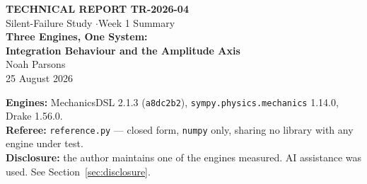\documentclass[11pt,a4paper]{article}
\newcommand{\gitsha}[1]{\texttt{#1}}
\begin{document}
\begin{titlepage}
\centering
\vspace*{2.2cm}
{\footnotesize\bfseries TECHNICAL REPORT TR-2026-04}\\[0.4em]
{\footnotesize Silent-Failure Study \quad$\cdot$\quad Week 1 Summary}\\[2.0cm]
{\LARGE\bfseries Three Engines, One System:\\[0.35em]
 Integration Behaviour and the Amplitude Axis}\\[1.5cm]
{\large Noah Parsons}\\[0.5cm]
{\normalsize 25 August 2026}\\[2.0cm]
\begin{minipage}{0.82\textwidth}
\small
\textbf{Engines:} MechanicsDSL 2.1.3 (\gitsha{a8dc2b2}),
\texttt{sympy.physics.mechanics} 1.14.0, Drake 1.56.0.\\[0.4em]
\textbf{Referee:} \texttt{reference.py} --- closed form, \texttt{numpy} only,
sharing no library with any engine under test.\\[0.4em]
\textbf{Disclosure:} the author maintains one of the engines measured. AI
assistance was used. See Section~\ref{sec:disclosure}.
\end{minipage}
\vfill
\end{titlepage}

\begin{abstract}
\noindent
Week 1 of the study is complete: the same mechanical system is expressed in
three engines, all three agree with an independent closed-form reference, and
all three have now been compared on integration as well as on derivation. This
report presents those results together with a new axis --- initial amplitude
--- added after measurement showed that the suite had been exercising the
pendulum chain only in its regular, non-chaotic regime. Across eight
amplitudes spanning the quiescent to the inverted configuration, and across the
chaotic regime at three degrees of freedom, no engine produced a wrong answer
and no engine failed. One shared behaviour is recorded at the inverted
equilibrium, where every engine \emph{and the independent reference} return
success while producing motion the exact solution does not have. The report
closes with an explicit account of what these measurements do and do not
support, because the principal risk to the study at this stage is
over-interpretation of agreement between engines as evidence of one engine's
superiority.
\end{abstract}
\end{document}
